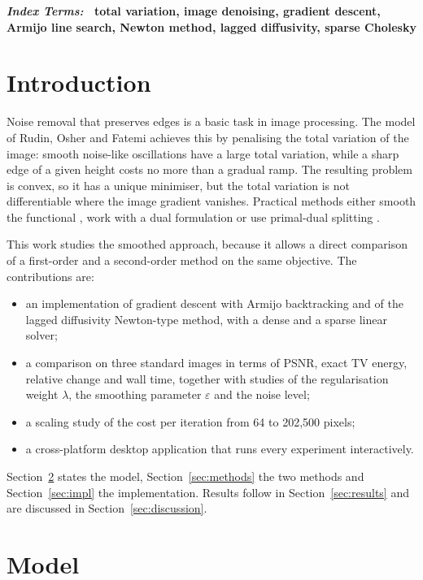 \documentclass[conference,a4paper]{IEEEtran}
\newenvironment{plainkeywords}{\par\noindent\small\bfseries\textit{Index Terms:}\ \ignorespaces}{\par\medskip}
\begin{document}
\begin{plainkeywords}
total variation, image denoising, gradient descent, Armijo line search, Newton method, lagged diffusivity, sparse Cholesky
\end{plainkeywords}

\section{Introduction}

Noise removal that preserves edges is a basic task in image processing. The model of Rudin, Osher and Fatemi \cite{rudin1992} achieves this by penalising the total variation of the image: smooth noise-like oscillations have a large total variation, while a sharp edge of a given height costs no more than a gradual ramp. The resulting problem is convex, so it has a unique minimiser, but the total variation is not differentiable where the image gradient vanishes. Practical methods either smooth the functional \cite{vogel1996}, work with a dual formulation \cite{chambolle2004} or use primal-dual splitting \cite{chambolle2011,beck2009}.

This work studies the smoothed approach, because it allows a direct comparison of a first-order and a second-order method on the same objective. The contributions are:
\begin{itemize}
\item an implementation of gradient descent with Armijo backtracking and of the lagged diffusivity Newton-type method, with a dense and a sparse linear solver;
\item a comparison on three standard images in terms of PSNR, exact TV energy, relative change and wall time, together with studies of the regularisation weight $\lambda$, the smoothing parameter $\varepsilon$ and the noise level;
\item a scaling study of the cost per iteration from 64 to 202{,}500 pixels;
\item a cross-platform desktop application that runs every experiment interactively.
\end{itemize}

Section~\ref{sec:model} states the model, Section~\ref{sec:methods} the two methods and Section~\ref{sec:impl} the implementation. Results follow in Section~\ref{sec:results} and are discussed in Section~\ref{sec:discussion}.

\section{Model}\label{sec:model}
\end{document}
